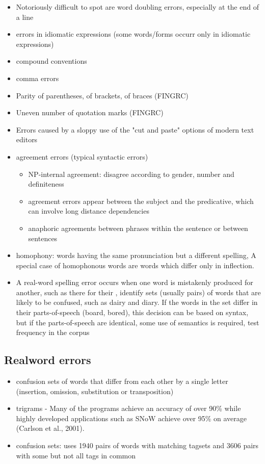 \documentclass[a4paper,english,12pt]{article}
\begin{document}
\begin{spacing}{1.0}
\begin{itemize}
\item Notoriously difficult to spot are word doubling errors, especially at the end of a line \citet{Vosse1992}
\item errors in idiomatic expressions (some words/forms occurr only in idiomatic expressions)
\item compound conventions
\item comma errors
\item Parity of parentheses, of brackets, of braces (FINGRC)
\item  Uneven number of quotation marks (FINGRC)
\item Errors caused by a sloppy use of the "cut and paste" options of modern text editors
\item agreement errors (typical syntactic errors) \citet{Vosse1992}
\begin{itemize}
\item NP-internal agreement: disagree according to gender, number and definiteness
\item agreement errors appear between the subject and the predicative, which can involve long distance dependencies
\item anaphoric agreements between phrases within the sentence or between sentences
\end{itemize}
\item homophony: words having the same pronunciation but a different spelling, A special case of homophonous words are words which differ only in inflection.
\item A real-word spelling error occurs when one word is mistakenly produced for another, such as there for their \citet{Pedler2005}, identify sets (usually pairs) of words that are likely to be confused, such as dairy and diary. If the words in the set differ in their parts-of-speech (board, bored), this decision can be based on syntax, but if the parts-of-speech are identical, some use of semantics is required, test frequency in the corpus
\end{itemize}

\subsection{Realword errors}

\begin{itemize}
\item confusion sets of words that differ from each other by a single letter (insertion, omission, substitution or transposition) \citet{Pedler2007}
\item trigrams - Many of the programs achieve an accuracy of over 90\% while highly developed applications
such as SNoW achieve over 95\% on average (Carlson et al., 2001). \citet{Pedler2007}
\item confusion sets: \citet{Pedler2007} uses 1940 pairs of words with matching tagsets and 3606 pairs with some but not all tags in common
\end{itemize}


\end{spacing}
\end{document}

